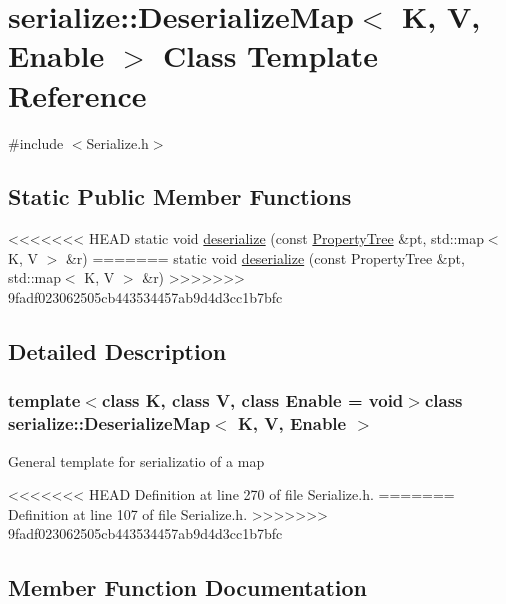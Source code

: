 \hypertarget{classserialize_1_1_deserialize_map}{}\section{serialize\+:\+:Deserialize\+Map$<$ K, V, Enable $>$ Class Template Reference}
\label{classserialize_1_1_deserialize_map}


{\ttfamily \#include $<$Serialize.\+h$>$}

\subsection*{Static Public Member Functions}
\begin{DoxyCompactItemize}
\item 
<<<<<<< HEAD
static void \hyperlink{classserialize_1_1_deserialize_map_af4827270beb08c018e840b9cec766cde}{deserialize} (const \hyperlink{namespacesolar__core_adeda2737d6938c190eb774a5b2495045}{Property\+Tree} \&pt, std\+::map$<$ K, V $>$ \&r)
=======
static void \hyperlink{classserialize_1_1_deserialize_map_af4827270beb08c018e840b9cec766cde}{deserialize} (const Property\+Tree \&pt, std\+::map$<$ K, V $>$ \&r)
>>>>>>> 9fadf023062505cb443534457ab9d4d3cc1b7bfc
\end{DoxyCompactItemize}


\subsection{Detailed Description}
\subsubsection*{template$<$class K, class V, class Enable = void$>$class serialize\+::\+Deserialize\+Map$<$ K, V, Enable $>$}

General template for serializatio of a map 

<<<<<<< HEAD
Definition at line 270 of file Serialize.\+h.
=======
Definition at line 107 of file Serialize.\+h.
>>>>>>> 9fadf023062505cb443534457ab9d4d3cc1b7bfc



\subsection{Member Function Documentation}
\hypertarget{classserialize_1_1_deserialize_map_af4827270beb08c018e840b9cec766cde}{}
